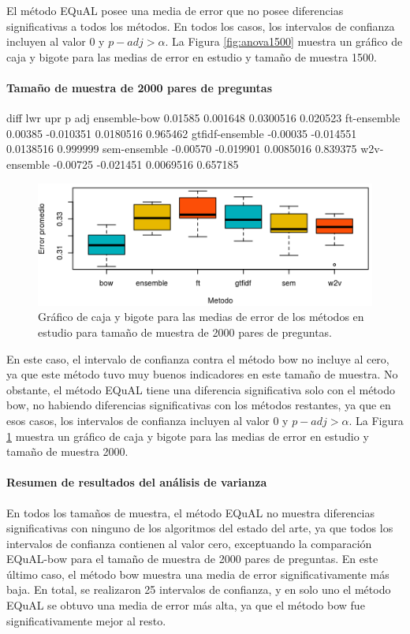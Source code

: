 \bigskip El método EQuAL posee una media de error que no posee diferencias significativas a todos los métodos. En todos los casos, los intervalos de confianza incluyen al valor 0 y \(p-adj > \alpha\). La Figura \ref{fig:anova1500} muestra un gráfico de caja y bigote para las medias de error en estudio y tamaño de muestra 1500.

\bigskip
\paragraph{Tamaño de muestra de 2000 pares de preguntas}
\begin{rc}
                  diff       lwr       upr      p adj
ensemble-bow     0.01585  0.001648 0.0300516 0.020523
ft-ensemble      0.00385 -0.010351 0.0180516 0.965462
gtfidf-ensemble -0.00035 -0.014551 0.0138516 0.999999
sem-ensemble    -0.00570 -0.019901 0.0085016 0.839375
w2v-ensemble    -0.00725 -0.021451 0.0069516 0.657185
\end{rc}

\begin{figure}
	\centering
	\includegraphics[width=0.7\linewidth]{10_resultados/imagenes/anova_2000}
	\caption{Gráfico de caja y bigote para las medias de error de los métodos en estudio para tamaño de muestra de 2000 pares de preguntas.}
	\label{fig:anova2000}
\end{figure}

\bigskip En este caso, el intervalo de confianza contra el método bow no incluye al cero, ya que este método tuvo muy buenos indicadores en este tamaño de muestra. No obstante, el método EQuAL tiene una diferencia significativa solo con el método bow, no habiendo diferencias significativas con los métodos restantes, ya que en esos casos, los intervalos de confianza incluyen al valor \(0\) y \(p-adj > \alpha\). La Figura \ref{fig:anova2000} muestra un gráfico de caja y bigote para las medias de error en estudio y tamaño de muestra 2000.

\bigskip
\paragraph{Resumen de resultados del análisis de varianza}
En todos los tamaños de muestra, el método EQuAL no muestra diferencias significativas con ninguno de los algoritmos del estado del arte, ya que todos los intervalos de confianza contienen al valor cero, exceptuando la comparación EQuAL-bow para el tamaño de muestra de 2000 pares de preguntas. En este último caso, el método bow muestra una media de error significativamente más baja. En total, se realizaron 25 intervalos de confianza, y en solo uno el método EQuAL se obtuvo una media de error más alta, ya que el método bow fue significativamente mejor al resto.

